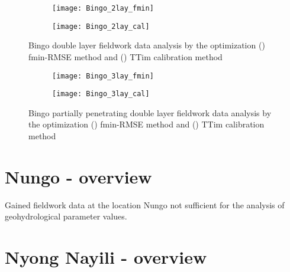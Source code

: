 \begin{figure}[h!]
	\centering
	\begin{subfigure}[b]{\linewidth}
		\centering\texttt{[image: Bingo\_2lay\_fmin]}
		\captionsetup{justification=centering}		
		\caption{\label{fig:Bingo_2lay_fmin}}
		\end{subfigure}\vfill
	\begin{subfigure}[b]{\linewidth}
		\centering\texttt{[image: Bingo\_2lay\_cal]}
		\captionsetup{justification=centering}		
		\caption{\label{fig:Bingo_2lay_cal}}
		\end{subfigure}
	\captionsetup{justification=centering}	
	\caption{Bingo double layer fieldwork data analysis by the optimization () fmin-RMSE method and () TTim calibration method} 
	\label{fig:Bingo_2lay_analysis}
\end{figure} 

\begin{figure}[h!]
	\centering
	\begin{subfigure}[b]{\linewidth}
		\centering\texttt{[image: Bingo\_3lay\_fmin]}
		\captionsetup{justification=centering}		
		\caption{\label{fig:Bingo_3lay_fmin}}
		\end{subfigure}\vfill
	\begin{subfigure}[b]{\linewidth}
		\centering\texttt{[image: Bingo\_3lay\_cal]}
		\captionsetup{justification=centering}		
		\caption{\label{fig:Bingo_3lay_cal}}
		\end{subfigure}
	\captionsetup{justification=centering}	
	\caption{Bingo partially penetrating double layer fieldwork data analysis by the optimization () fmin-RMSE method and () TTim calibration method} 
	\label{fig:Bingo_3lay_analysis}
\end{figure} 

\clearpage\section{Nungo - overview}
\label{sec:Nungo_overview}

Gained fieldwork data at the location Nungo not sufficient for the analysis of geohydrological parameter values.  

\clearpage\section{Nyong Nayili - overview}
\label{sec:Nyong_Nayili_overview}

